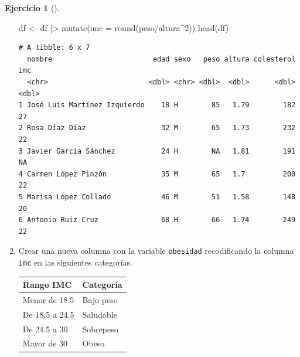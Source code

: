 \documentclass[
  a4paper,
]{scrreport}
\newenvironment{Shaded}{\begin{snugshade}}{\end{snugshade}}
\newcommand{\AttributeTok}[1]{\textcolor[rgb]{0.40,0.45,0.13}{#1}}
\newcommand{\DecValTok}[1]{\textcolor[rgb]{0.68,0.00,0.00}{#1}}
\newcommand{\FunctionTok}[1]{\textcolor[rgb]{0.28,0.35,0.67}{#1}}
\newcommand{\NormalTok}[1]{\textcolor[rgb]{0.00,0.23,0.31}{#1}}
\newcommand{\OtherTok}[1]{\textcolor[rgb]{0.00,0.23,0.31}{#1}}
\newcommand{\SpecialCharTok}[1]{\textcolor[rgb]{0.37,0.37,0.37}{#1}}
\theoremstyle{definition}
\newtheorem{exercise}{Ejercicio}[chapter]
\theoremstyle{remark}
\begin{document}
\begin{exercise}[]
\begin{enumerate}
\begin{tcolorbox}
\begin{Shaded}
\begin{Highlighting}[]
\NormalTok{df }\OtherTok{\textless{}{-}}\NormalTok{ df }\SpecialCharTok{|\textgreater{}} \FunctionTok{mutate}\NormalTok{(}\AttributeTok{imc =} \FunctionTok{round}\NormalTok{(peso}\SpecialCharTok{/}\NormalTok{altura}\SpecialCharTok{\^{}}\DecValTok{2}\NormalTok{))}
\FunctionTok{head}\NormalTok{(df)}
\end{Highlighting}
\end{Shaded}

\begin{verbatim}
# A tibble: 6 x 7
  nombre                        edad sexo   peso altura colesterol   imc
  <chr>                        <dbl> <chr> <dbl>  <dbl>      <dbl> <dbl>
1 José Luis Martínez Izquierdo    18 H        85   1.79        182    27
2 Rosa Díaz Díaz                  32 M        65   1.73        232    22
3 Javier García Sánchez           24 H        NA   1.81        191    NA
4 Carmen López Pinzón             35 M        65   1.7         200    22
5 Marisa López Collado            46 M        51   1.58        148    20
6 Antonio Ruiz Cruz               68 H        66   1.74        249    22
\end{verbatim}

  \end{tcolorbox}
\item
  Crear una nueva columna con la variable \texttt{obesidad}
  recodificando la columna \texttt{imc} en las siguientes categorías.

  \begin{longtable}[]{@{}ll@{}}
  \toprule\noalign{}
  Rango IMC & Categoría \\
  \midrule\noalign{}
  \endhead
  \bottomrule\noalign{}
  \endlastfoot
  Menor de 18.5 & Bajo peso \\
  De 18.5 a 24.5 & Saludable \\
  De 24.5 a 30 & Sobrepeso \\
  Mayor de 30 & Obeso \\
  \end{longtable}

  \begin{tcolorbox}[enhanced jigsaw, breakable, toptitle=1mm, colbacktitle=quarto-callout-tip-color!10!white, rightrule=.15mm, opacityback=0, opacitybacktitle=0.6, titlerule=0mm, coltitle=black, colframe=quarto-callout-tip-color-frame, colback=white, bottomtitle=1mm, leftrule=.75mm, toprule=.15mm, title=\textcolor{quarto-callout-tip-color}{\faLightbulb}\hspace{0.5em}{Solución}, arc=.35mm, bottomrule=.15mm, left=2mm]


\end{tcolorbox}
\end{enumerate}
\end{exercise}
\end{document}
